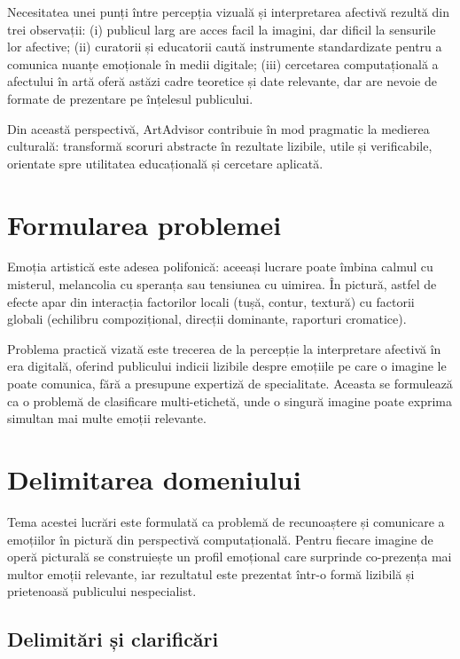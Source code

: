 Necesitatea unei punți între percepția vizuală și interpretarea afectivă rezultă din trei observații: (i) publicul larg are acces facil la imagini, dar dificil la sensurile lor afective; (ii) curatorii și educatorii caută instrumente standardizate pentru a comunica nuanțe emoționale în medii digitale; (iii) cercetarea computațională a afectului în artă oferă astăzi cadre teoretice și date relevante, dar are nevoie de formate de prezentare pe înțelesul publicului.

Din această perspectivă, ArtAdvisor contribuie în mod pragmatic la medierea culturală: transformă scoruri abstracte în rezultate lizibile, utile și verificabile, orientate spre utilitatea educațională și cercetare aplicată.

\section{Formularea problemei}
\label{sec:intro-problema}

Emoția artistică este adesea polifonică: aceeași lucrare poate îmbina calmul cu misterul, melancolia cu speranța sau tensiunea cu uimirea. În pictură, astfel de efecte apar din interacția factorilor locali (tușă, contur, textură) cu factorii globali (echilibru compozițional, direcții dominante, raporturi cromatice).

Problema practică vizată este trecerea de la percepție la interpretare afectivă în era digitală, oferind publicului indicii lizibile despre emoțiile pe care o imagine le poate comunica, fără a presupune expertiză de specialitate. Aceasta se formulează ca o problemă de clasificare multi-etichetă, unde o singură imagine poate exprima simultan mai multe emoții relevante.

\section{Delimitarea domeniului}
\label{sec:intro-domeniu}

Tema acestei lucrări este formulată ca problemă de recunoaștere și comunicare a emoțiilor în pictură din perspectivă computațională. Pentru fiecare imagine de operă picturală se construiește un profil emoțional care surprinde co-prezența mai multor emoții relevante, iar rezultatul este prezentat într-o formă lizibilă și prietenoasă publicului nespecialist.

\subsection{Delimitări și clarificări}

